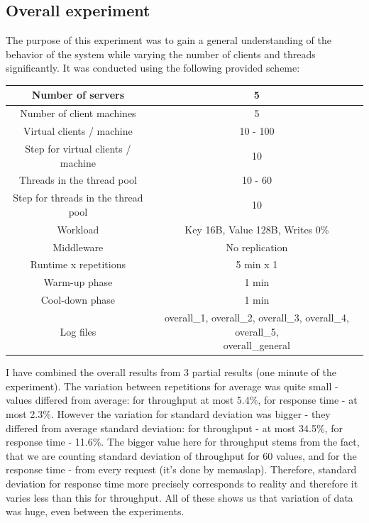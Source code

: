 \documentclass[11pt]{article}
\begin{document}
\subsection{Overall experiment}
The purpose of this experiment was to gain a general understanding of the behavior of the system while varying the number of clients and threads significantly. It was conducted using the following provided scheme:
\medskip

\small{
\smallskip
\begin{tabular}{|c|c|}
\hline Number of servers & 5 \\ 
\hline Number of client machines & 5 \\ 
\hline Virtual clients / machine & 10 - 100 \\ 
\hline Step for virtual clients / machine & 10 \\ 
\hline Threads in the thread pool & 10 - 60 \\
\hline Step for threads in the thread pool & 10 \\
\hline Workload & Key 16B, Value 128B, Writes 0\% \\
\hline Middleware & No replication \\ 
\hline Runtime x repetitions & 5 min x 1 \\ 
\hline Warm-up phase & 1 min \\
\hline Cool-down phase & 1 min \\

\hline Log files & \parbox[t]{8cm}{overall\_1, overall\_2, overall\_3, overall\_4, overall\_5, \\ overall\_general} \\[3.4ex]
\hline 
\end{tabular} }
\medskip

I have combined the overall results from 3 partial results (one minute of the experiment). The variation between repetitions for average was quite small - values differed from average: for throughput at most 5.4\%, for response time - at most 2.3\%. However the variation for standard deviation was bigger - they differed from average standard deviation: for throughput - at most 34.5\%, for response time - 11.6\%. The bigger value here for throughput stems from the fact, that we are counting standard deviation of throughput for 60 values, and for the response time - from every request (it's done by memaslap). Therefore, standard deviation for response time more precisely corresponds to reality and therefore it varies less than this for throughput. All of these shows us that variation of data was huge, even between the experiments.
\end{document}
